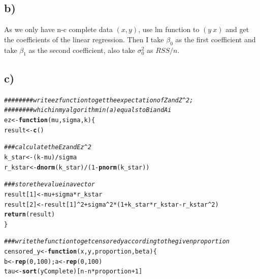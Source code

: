 \documentclass{article}\usepackage[]{graphicx}\usepackage[]{color}
\makeatletter
\newcommand{\hlnum}[1]{\textcolor[rgb]{0.686,0.059,0.569}{#1}}%
\newcommand{\hlcom}[1]{\textcolor[rgb]{0.678,0.584,0.686}{\textit{#1}}}%
\newcommand{\hlopt}[1]{\textcolor[rgb]{0,0,0}{#1}}%
\newcommand{\hlstd}[1]{\textcolor[rgb]{0.345,0.345,0.345}{#1}}%
\newcommand{\hlkwa}[1]{\textcolor[rgb]{0.161,0.373,0.58}{\textbf{#1}}}%
\newcommand{\hlkwb}[1]{\textcolor[rgb]{0.69,0.353,0.396}{#1}}%
\newcommand{\hlkwc}[1]{\textcolor[rgb]{0.333,0.667,0.333}{#1}}%
\newcommand{\hlkwd}[1]{\textcolor[rgb]{0.737,0.353,0.396}{\textbf{#1}}}%
\newenvironment{kframe}{%
 \def\at@end@of@kframe{}%
 \ifinner\ifhmode%
  \def\at@end@of@kframe{\end{minipage}}%
  \begin{minipage}{\columnwidth}%
 \fi\fi%
 \def\FrameCommand##1{\hskip\@totalleftmargin \hskip-\fboxsep
 \colorbox{shadecolor}{##1}\hskip-\fboxsep
     \hskip-\linewidth \hskip-\@totalleftmargin \hskip\columnwidth}%
 \MakeFramed {\advance\hsize-\width
   \@totalleftmargin\z@ \linewidth\hsize
   \@setminipage}}%
 {\par\unskip\endMakeFramed%
 \at@end@of@kframe}
\newenvironment{knitrout}{}{} %
\makeatother
\begin{document}
\subsection{b)}
As we only have n-c complete data $(x,y)$, use lm function to $(y~x)$ and get the coefficients of the linear regression. Then I take $\beta_0$ as the first coefficient and take $\beta_1$ as the second coefficient, also take $\sigma_0^2$ as $RSS/n$.

\subsection{c)}
\begin{knitrout}
\color{fgcolor}\begin{kframe}
\begin{alltt}
\hlcom{######## write ez function to get the expectation of Z and Z^2;}
\hlcom{######## which in my algorithm in (a) equals to Bi and Ai}
\hlstd{ez}\hlkwb{<-}\hlkwa{function}\hlstd{(}\hlkwc{mu}\hlstd{,}\hlkwc{sigma}\hlstd{,}\hlkwc{k}\hlstd{)\{}
  \hlstd{result}\hlkwb{<-}\hlkwd{c}\hlstd{()}

  \hlcom{###calculate the Ez and Ez^2}
  \hlstd{k_star}\hlkwb{<-}\hlstd{(k}\hlopt{-}\hlstd{mu)}\hlopt{/}\hlstd{sigma}
  \hlstd{r_kstar}\hlkwb{<-}\hlkwd{dnorm}\hlstd{(k_star)}\hlopt{/}\hlstd{(}\hlnum{1}\hlopt{-}\hlkwd{pnorm}\hlstd{(k_star))}

  \hlcom{###store the value in a vector}
  \hlstd{result[}\hlnum{1}\hlstd{]}\hlkwb{<-}\hlstd{mu}\hlopt{+}\hlstd{sigma}\hlopt{*}\hlstd{r_kstar}
  \hlstd{result[}\hlnum{2}\hlstd{]}\hlkwb{<-}\hlstd{result[}\hlnum{1}\hlstd{]}\hlopt{^}\hlnum{2}\hlopt{+}\hlstd{sigma}\hlopt{^}\hlnum{2}\hlopt{*}\hlstd{(}\hlnum{1}\hlopt{+}\hlstd{k_star}\hlopt{*}\hlstd{r_kstar}\hlopt{-}\hlstd{r_kstar}\hlopt{^}\hlnum{2}\hlstd{)}
  \hlkwd{return}\hlstd{(result)}
\hlstd{\}}

\hlcom{###write the function to get censored y according to the given proportion}
\hlstd{censored_y}\hlkwb{<-}\hlkwa{function}\hlstd{(}\hlkwc{x}\hlstd{,}\hlkwc{y}\hlstd{,}\hlkwc{proportion}\hlstd{,}\hlkwc{beta}\hlstd{)\{}
  \hlstd{b}\hlkwb{<-}\hlkwd{rep}\hlstd{(}\hlnum{0}\hlstd{,}\hlnum{100}\hlstd{);a}\hlkwb{<-}\hlkwd{rep}\hlstd{(}\hlnum{0}\hlstd{,}\hlnum{100}\hlstd{)}
  \hlstd{tau}\hlkwb{<-}\hlkwd{sort}\hlstd{(yComplete)[n}\hlopt{-}\hlstd{n}\hlopt{*}\hlstd{proportion}\hlopt{+}\hlnum{1}\hlstd{]}


\end{alltt}
\end{kframe}
\end{knitrout}
\end{document}
